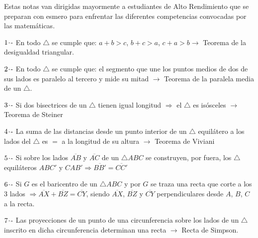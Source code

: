 Estas notas van dirigidas mayormente a estudiantes de Alto Rendimiento que se preparan con esmero para enfrentar las diferentes competencias convocadas por las matemáticas.

$1\hspace{-0.05cm}\cdot\hspace{-0.05cm}\text{-}$ En todo $\triangle$ se cumple que: $a+b>c$, $b+c>a$, $c+a>b \longrightarrow$ Teorema de la desigualdad triangular.

$2\hspace{-0.05cm}\cdot\hspace{-0.05cm}\text{-}$ En todo $\triangle$ se cumple que: el segmento que une los puntos medios de dos de sus lados es paralelo al tercero y mide su mitad $\longrightarrow$ Teorema de la paralela media de un $\triangle$.

$3\hspace{-0.05cm}\cdot\hspace{-0.05cm}\text{-}$ Si dos bisectrices de un $\triangle$ tienen igual longitud $\Longrightarrow$ el $\triangle$ es isósceles $\longrightarrow$ Teorema de Steiner

$4\hspace{-0.05cm}\cdot\hspace{-0.05cm}\text{-}$ La suma de las distancias desde un punto interior de un $\triangle$ equilátero a los lados del $\triangle$ es $=$ a la longitud de su altura $\longrightarrow$ Teorema de Viviani

$5\hspace{-0.05cm}\cdot\hspace{-0.05cm}\text{-}$ Si sobre los lados $\overline{AB}$ y $\overline{AC}$ de un $\triangle ABC$ se construyen, por fuera, los $\triangle$ equiláteros $ABC'$ y $CAB' \Longrightarrow \overline{BB'} = \overline{CC'}$

$6\hspace{-0.05cm}\cdot\hspace{-0.05cm}\text{-}$ Si $G$ es el baricentro de un $\triangle ABC$ y por $G$ se traza una recta que corte a los 3 lados $\Longrightarrow \overline{AX} + \overline{BZ} = \overline{CY}$, siendo $\overline{AX}$, $\overline{BZ}$ y $\overline{CY}$ perpendiculares desde $A$, $B$, $C$ a la recta.

$7\hspace{-0.05cm}\cdot\hspace{-0.05cm}\text{-}$ Las proyecciones de un punto de una circunferencia sobre los lados de un $\triangle$ inscrito en dicha circunferencia determinan una recta $\longrightarrow$ Recta de Simpson.

